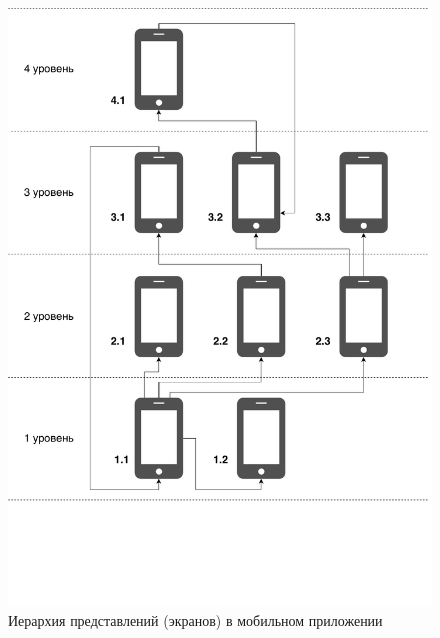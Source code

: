 \begin{figure}[ht]
   \centering
   \includegraphics[scale=.75]{figures/app-sceme-naked.pdf}
    \caption{Иерархия представлений (экранов) в мобильном приложении}
    \label{app-sceme-naked}
\end{figure}
\label{cha:Experiment}
 